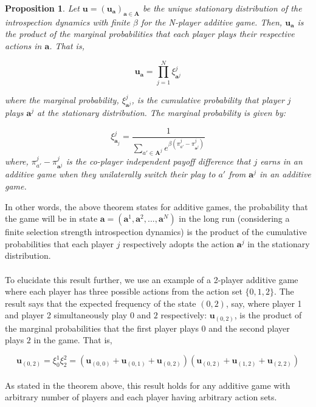 \documentclass[11pt]{article}
\theoremstyle{plainCl1}
\newtheorem{Prop}{Proposition}
\theoremstyle{plainCl2}
\newcommand{\A}{\mathbf{A}}
\newcommand{\abf}{\mathbf{a}}
\newcommand{\ubf}{\mathbf{u}}
\begin{document}
\begin{Prop}
Let $\ubf = (\ubf_\abf)_{\abf \in \A}$ be the unique stationary distribution of the introspection dynamics with finite $\beta$ for the N-player additive game. Then, $\ubf_\abf$ is the product of the marginal probabilities that each player plays their respective actions in $\abf$. That is, 

\begin{equation}
\ubf_\abf = \prod_{j = 1}^N \xi^j_{\abf^j}
\label{Eq:additive-game-products}
\end{equation}

\noindent where the marginal probability, $\xi^j_{\abf^j}$, is the cumulative probability that player $j$ plays $\abf^j$ at the stationary distribution. The marginal probability is given by: 

\begin{equation}
\xi^j_{\abf_j} = \frac{1}{\displaystyle \sum_{a' \in \A^j} e^{\beta \left( \pi^j_{a'} -  \pi^j_{\abf^j} \right) }} 
\label{Eq:marginal-at-additive-game}
\end{equation}
\noindent where, $\pi^j_{a'} - \pi^j_{\abf^j}$ is the co-player independent payoff difference that $j$  earns in an additive game when they unilaterally switch their play to $a'$ from $\abf^j$ in an additive game.
\label{Th:additive-game-product-of-marginals}
\end{Prop}

\noindent In other words, the above theorem states for additive games, the probability that the game will be in state $\abf = (\abf^1, \abf^2, ...,\abf^N)$ in the long run (considering a finite selection strength introspection dynamics) is the product of the cumulative probabilities that each player $j$ respectively adopts the action $\abf^j$ in the stationary distribution. \\ \\
\noindent To elucidate this result further, we use an example of a 2-player additive game where each player has three possible actions from the action set $\{\mathit{0},\mathit{1},\mathit{2}\}$. The result says that the expected frequency of the state $(\mathit{0,2})$, say, where player 1 and player 2 simultaneously play $\mathit{0}$ and $\mathit{2}$ respectively: $\ubf_{(\mathit{0,2})}$, is the product of the marginal probabilities that the first player plays $\mathit{0}$ and the second player plays $\mathit{2}$ in the game. That is, 

\begin{equation}
\ubf_{(\mathit{0,2})} = \xi^1_{\mathit{0}}  \xi^2_{\mathit{2}} = (\ubf_{(\mathit{0,0})} + \ubf_{(\mathit{0,1})} + \ubf_{(\mathit{0,2})})(\ubf_{(\mathit{0,2})} + \ubf_{(\mathit{1,2})} + \ubf_{(\mathit{2,2})}) 
\label{Eq:additive-stationary-dist-example}
\end{equation}
\\
\noindent As stated in the theorem above, this result holds for any additive game with arbitrary number of players and each player having arbitrary action sets.
\end{document}
